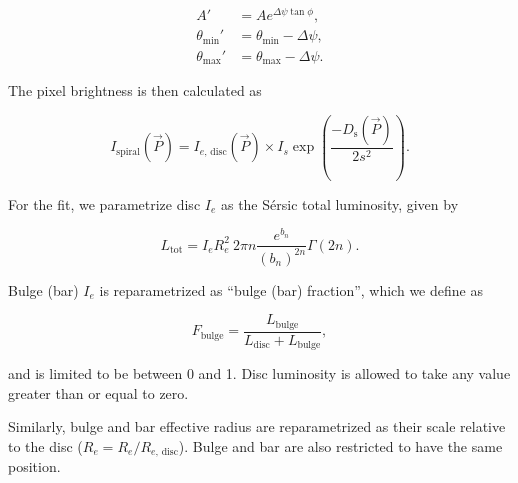 \documentclass[trackchanges]{aastex63}
\begin{document}
\begin{equation}
\begin{aligned}
  A' &= Ae^{\Delta\psi\tan\phi},\\
  \theta_\mathrm{min}' &= \theta_\mathrm{min} - \Delta\psi,\\
  \theta_\mathrm{max}' &= \theta_\mathrm{max} - \Delta\psi.
\end{aligned}
\end{equation}

The pixel brightness is then calculated as

\begin{equation}
I_\mathrm{spiral}(\vec{P}) = I_{e,\,\mathrm{disc}}(\vec{P}) \times I_s\exp\left(\frac{-D_\mathrm{s}(\vec{P})}{2s^2}\right).
\end{equation}

For the fit, we parametrize disc $I_e$ as the S\'ersic total luminosity, given by

\begin{equation}
L_\mathrm{tot} = I_e R_e^2\ 2\pi n\frac{e^{b_n}}{(b_n)^{2n}}\Gamma(2n).
\end{equation}

Bulge (bar) $I_e$ is reparametrized as ``bulge (bar) fraction'', which we define as

\begin{equation}
F_\mathrm{bulge} = \frac{L_\mathrm{bulge}}{L_\mathrm{disc} + L_\mathrm{bulge}},
\end{equation}

and is limited to be between 0 and 1. Disc luminosity is allowed to take any value greater than or equal to zero.

Similarly, bulge and bar effective radius are reparametrized as their scale relative to the disc ($R_e = R_e / R_{e,\,\mathrm{disc}}$). Bulge and bar are also restricted to have the same position.






\listofchanges
\end{document}
